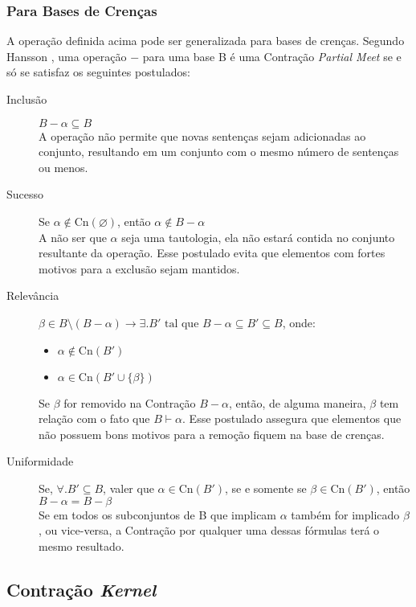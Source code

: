\subsubsection{Para Bases de Crenças}

A operação definida acima pode ser generalizada para bases de crenças. Segundo Hansson \cite{revisaoHansson2}, uma operação $ - $ para uma base B é uma Contração \textit{Partial Meet} se e só se satisfaz os seguintes postulados:

\begin{description}
	\item[Inclusão] $ B - \alpha \subseteq B$ \\ A operação não permite que novas sentenças sejam adicionadas ao conjunto, resultando em um conjunto com o mesmo número de sentenças ou menos.
	\item[Sucesso] Se $ \alpha \notin \text{Cn}(\varnothing) $, então $ \alpha \notin B - \alpha $ \\ A não ser que $ \alpha $ seja uma tautologia, ela não estará contida no conjunto resultante da operação. Esse postulado evita que elementos com fortes motivos para a exclusão sejam mantidos.
	\item[Relevância] $ \beta \in B \setminus (B - \alpha) \to \exists. B' \text{ tal que } B - \alpha \subseteq B' \subseteq B $, onde:
	\begin{itemize}
		\item $ \alpha \notin \text{Cn}(B') $
		\item $ \alpha \in \text{Cn}(B' \cup \{\beta\}) $ 
	\end{itemize}
	Se $ \beta $ for removido na Contração $ B - \alpha $, então, de alguma maneira, $ \beta $ tem relação com o fato que $ B \vdash \alpha$. Esse postulado assegura que elementos que não possuem bons motivos para a remoção fiquem na base de crenças.
	\item[Uniformidade] Se, $ \forall.B' \subseteq B $, valer que $ \alpha \in \text{Cn}(B') $, se e somente se $ \beta \in \text{Cn}(B') $, então $ B - \alpha = B - \beta $ \\
	Se em todos os subconjuntos de B que implicam $ \alpha $ também for implicado $ \beta $, ou vice-versa, a Contração por qualquer uma dessas fórmulas terá o mesmo resultado.
\end{description}

\subsection{Contração \textit{Kernel}}


